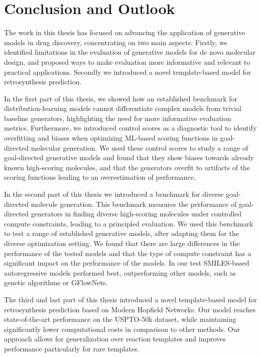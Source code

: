 \chapter{Conclusion and Outlook\label{chap:conclusion}}

The work in this thesis has focused on advancing the application of generative models in drug
discovery, concentrating on two main aspects: Firstly, we identified limitations in the evaluation
of generative models for de novo molecular design, and proposed ways to make evaluation more
informative and relevant to practical applications. Secondly we introduced a novel template-based
model for retrosynthesis prediction.

In the first part of this thesis, we showed how an established benchmark for distribution-learning
models cannot differentiate complex models from trivial baseline generators, highlighting the need
for more informative evaluation metrics. Furthermore, we introduced control scores as a diagnostic
tool to identify overfitting and biases when optimizing \ac{ML}-based scoring functions in
goal-directed molecular generation. We used these control scores to study a range of goal-directed
generative models and found that they show biases towards already known high-scoring molecules,
and that the generators overfit to artifacts of the scoring functions leading to an overestimation
of performance.

In the second part of this thesis we introduced a benchmark for diverse goal-directed molecule
generation. This benchmark measures the performance of goal-directed generators in finding diverse
high-scoring molecules under controlled compute constraints, leading to a principled evaluation. We
used this benchmark to test a range of established generative models, after adapting them for the
diverse optimization setting. We found that there are large differences in the performance of the
tested models and that the type of compute constraint has a significant impact on the performance of
the models. In our test SMILES-based autoregressive models performed best, outperforming other
models, such as genetic algorithms or GFlowNets.

The third and last part of this thesis introduced a novel template-based model for retrosynthesis
prediction based on Modern Hopfield Networks. Our model reaches state-of-the-art performance on the
USPTO-50k dataset, while maintaining significantly lower computational costs in comparison to other
methods. Our approach allows for generalization over reaction templates and improves performance
particularly for rare templates.

